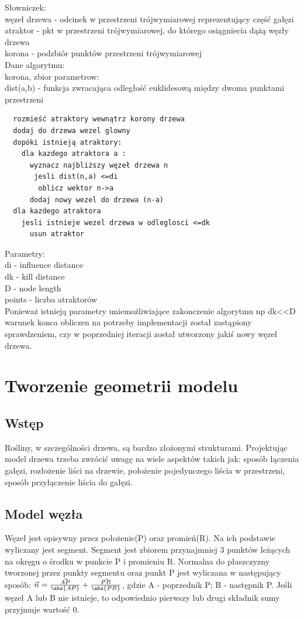 Słowniczek:\\
węzeł drzewa - odcinek w przestrzeni trójwymiarowej reprezentujący część gałęzi\\
atraktor - pkt w przestrzeni trójwymiarowej, do którego osiągniecia dążą węzły drzewa\\
korona - podzbiór punktów przestrzeni trójwymiarowej\\

Dane algorytmu: \\
korona, zbior parametrow: \\
dist(a,b) - funkcja zwracająca odległość euklidesową między dwoma punktami przestrzeni  \\
\begin{verbatim}
  rozmieść atraktory wewnątrz korony drzewa
  dodaj do drzewa wezel glowny
  dopóki istnieją atraktory:
    dla kazdego atraktora a :
      wyznacz najbliższy węzeł drzewa n
       jesli dist(n,a) <=di
        oblicz wektor n->a
      dodaj nowy wezel do drzewa (n-a)
  dla kazdego atraktora
    jesli istnieje wezel drzewa w odleglosci <=dk
      usun atraktor
\end{verbatim}
Parametry: \\
di - influence distance\\
dk - kill distance\\
D - node length\\
points - liczba atraktorów\\

Ponieważ istnieją parametry uniemożliwiające zakonczenie algorytmu np dk<<D warunek konca obliczen na potrzeby implementacji został zastąpiony sprawdzeniem, czy w poprzedniej iteracji został utworzony jakiś nowy węzeł drzewa.
\section{Tworzenie geometrii modelu}
\subsection{Wstęp}
Rośliny, w szczególności drzewa, są bardzo złożonymi strukturami. Projektując model drzewa trzeba zwrócić uwagę na wiele aspektów takich jak: sposób łączenia gałęzi, rozłożenie liści na drzewie, położenie pojedynczego liścia w przestrzeni, sposób przyłączenie liścia do gałęzi.


\subsection{Model węzła}
Węzeł jest opisywny przez położenie(P) oraz promień(R). Na ich podstawie wyliczany jest segment. Segment jest zbiorem przynajmniej 3 punktów leżących na okręgu o środku w punkcie P i promieniu R. Normalna do płaszczyzny tworzonej przez punkty segmentu oraz punkt P jest wyliczana w następujący sposób: $\vec{n}=\frac{\vec{AP}}{\abs{AP}}+\frac{\vec{PB}}{\abs{PB}}$, gdzie A - poprzednik P; B - następnik P. Jeśli węzeł A lub B nie istnieje, to odpowiednio pierwszy lub drugi składnik sumy przyjmuje wartość 0.

